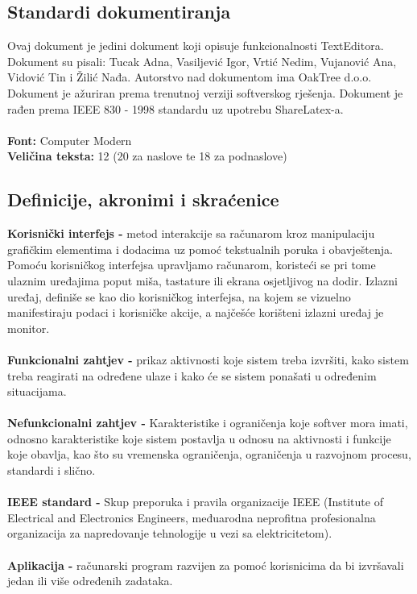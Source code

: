 \documentclass[12pt]{article}
\begin{document}
\subsection{Standardi dokumentiranja}

Ovaj dokument je jedini dokument koji opisuje funkcionalnosti TextEditora. Dokument su pisali: Tucak Adna, Vasiljević Igor, Vrtić Nedim, Vujanović Ana, Vidović Tin i Žilić Nađa. Autorstvo nad dokumentom ima OakTree d.o.o. Dokument je ažuriran prema trenutnoj verziji softverskog rješenja. Dokument je rađen prema IEEE 830 - 1998 standardu uz upotrebu ShareLatex-a.\\ \\
\textbf{Font:} Computer Modern\\ 
\textbf{Veličina teksta:} 12 (20 za naslove te 18 za podnaslove)


\subsection{Definicije, akronimi i skraćenice}


\textbf{Korisnički interfejs - }metod interakcije sa računarom kroz manipulaciju grafičkim elementima i dodacima uz pomoć tekstualnih poruka i obavještenja. Pomoću korisničkog interfejsa upravljamo računarom, koristeći se pri tome ulaznim uređajima poput miša, tastature ili ekrana osjetljivog na dodir. Izlazni uređaj, definiše se kao dio korisničkog interfejsa, na kojem se vizuelno manifestiraju podaci i korisničke akcije, a najčešće korišteni izlazni uređaj je monitor.\\ \\
\textbf{Funkcionalni zahtjev - }prikaz aktivnosti koje sistem treba izvršiti, kako sistem treba reagirati na određene ulaze i kako će se sistem ponašati u određenim situacijama.\\ \\
\textbf{Nefunkcionalni zahtjev - }Karakteristike i ograničenja koje softver mora imati, odnosno karakteristike koje sistem postavlja u odnosu na aktivnosti i funkcije koje obavlja, kao što su vremenska ograničenja, ograničenja u razvojnom procesu, standardi i slično.\\ \\
\textbf{IEEE standard - }Skup preporuka i pravila organizacije IEEE (Institute of Electrical and Electronics Engineers, međuarodna neprofitna profesionalna organizacija za napredovanje tehnologije u vezi sa elektricitetom).\\ \\
\textbf{Aplikacija - }računarski program razvijen za pomoć korisnicima da bi izvršavali jedan ili više određenih zadataka.
\end{document}
